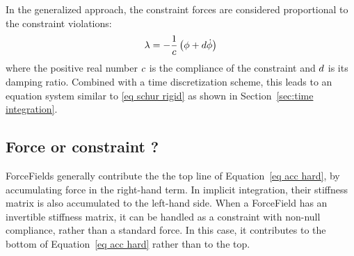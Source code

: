 In the generalized approach, the constraint forces are considered proportional to the constraint violations:
\begin{equation}\label{eq generalized constraint}
\mathbf{\lambda} = - \frac{1}{c} \left( \phi + d \dot {\phi} \right)
\end{equation}
where the positive real number $c$ is the compliance of the constraint and $d$ is its damping ratio.
Combined with a time discretization scheme, this leads to an equation system similar to \eqref{eq schur rigid} as shown in Section~\ref{sec:time integration}.

\subsection{Force or constraint ?} \label{sec force or constraint}
ForceFields generally contribute the the top line of Equation~\ref{eq acc hard}, by accumulating force in the right-hand term. In implicit integration, their stiffness matrix is also accumulated to the left-hand side.
When a ForceField has an invertible stiffness matrix, it can be handled as a constraint with non-null compliance, rather than a standard force. In this case, it contributes to the bottom of Equation~\ref{eq acc hard} rather than to the top.

